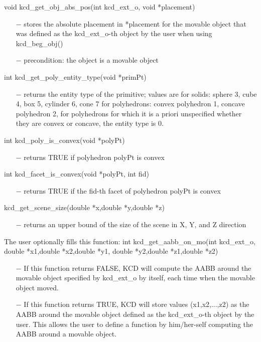 void kcd\_get\_obj\_abs\_pos(int kcd\_ext\_o, void *placement)
\begin{itemize}
    \item[$-$] stores the absolute placement in *placement for the 
      movable object that was defined as the kcd\_ext\_o-th 
      object by the user when using kcd\_beg\_obj()
    \item[$-$] precondition: the object is a movable object
\end{itemize}
int kcd\_get\_poly\_entity\_type(void *primPt)
\begin{itemize}
  \item[$-$] returns the entity type of the primitive; values are
    for solids: sphere 3, cube 4, box 5, cylinder 6, cone 7
    for polyhedrons: convex polyhedron 1, concave polyhedron 2,
    for polyhedrons for which it is a priori unspecified whether 
    they are convex or concave, the entity type is 0.
\end{itemize}
int kcd\_poly\_is\_convex(void *polyPt)
\begin{itemize}
  \item[$-$] returns TRUE if polyhedron polyPt is convex
\end{itemize}
int kcd\_facet\_is\_convex(void *polyPt, int fid)
\begin{itemize}
  \item[$-$] returns TRUE if the fid-th facet of polyhedron polyPt is convex
\end{itemize}
kcd\_get\_scene\_size(double *x,double *y,double *z)
\begin{itemize}
    \item[$-$] returns an upper bound of the size of 
      the scene in X, Y, and Z direction
\end{itemize}
The user optionally fills this function:
int kcd\_get\_aabb\_on\_mo(int kcd\_ext\_o, 
                           double *x1,double *x2,double *y1,
                           double *y2,double *z1,double *z2)
\begin{itemize}
 \item[$-$] If this function returns FALSE, KCD will compute the AABB around
   the movable object specified by kcd\_ext\_o by itself, each time
   when the movable object moved.
 \item[$-$] If this function returns TRUE, KCD will store values (x1,x2,...,z2)
   as the AABB around the movable object defined as the kcd\_ext\_o-th 
   object by the user. This allows the user to define a function by
   him/her-self computing the AABB around a movable object.
\end{itemize}
